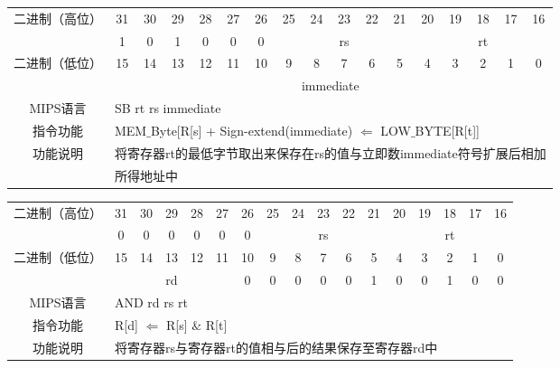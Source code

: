 \begin{table}
\begin{tabular}{|c|c|c|c|c|c|c|c|c|c|c|c|c|c|c|c|c|}
\hline
\multirow{2}{*}{二进制（高位）} &
31&30&29&28&27&26&25&24&23&22&21&20&19&18&17&16\\
\cline{2-17}
&
1&0&1&0&0&
0&
\multicolumn{5}{c|}{rs}&
\multicolumn{5}{c|}{rt}\\
\hline
\multirow{2}{*}{二进制（低位）} &
15&14&13&12&11&10&9&8&7&6&5&4&3&2&1&0\\
\cline{2-17}
&
\multicolumn{16}{c|}{immediate}\\
\hline
MIPS语言&
\multicolumn{16}{l|}{SB rt rs immediate}\\
\hline
指令功能&
\multicolumn{16}{l|}{MEM$\_$Byte[R[s] + Sign-extend(immediate) $\Leftarrow$ LOW$\_$BYTE[R[t]]}\\
\hline
\multirow{2}{*}{功能说明}&
\multicolumn{16}{l|}{将寄存器rt的最低字节取出来保存在rs的值与立即数immediate符号扩展后相加}\\
&\multicolumn{16}{l|}{所得地址中}\\
\hline
\end{tabular}
\end{table}

\clearpage

\begin{table}
\begin{tabular}{|c|c|c|c|c|c|c|c|c|c|c|c|c|c|c|c|c|}
\hline
\multirow{2}{*}{二进制（高位）} &
31&30&29&28&27&26&25&24&23&22&21&20&19&18&17&16\\
\cline{2-17}
&
0&0&0&0&0&
0&
\multicolumn{5}{c|}{rs}&
\multicolumn{5}{c|}{rt}\\
\hline
\multirow{2}{*}{二进制（低位）} &
15&14&13&12&11&10&9&8&7&6&5&4&3&2&1&0\\
\cline{2-17}
&
\multicolumn{5}{c|}{rd}&
0&0&0&0&0&
1&0&0&1&0&
0\\
\hline
MIPS语言&
\multicolumn{16}{l|}{AND rd rs rt}\\
\hline
指令功能&
\multicolumn{16}{l|}{R[d] $\Leftarrow$ R[s] $\&$ R[t]}\\
\hline
功能说明&
\multicolumn{16}{l|}{将寄存器rs与寄存器rt的值相与后的结果保存至寄存器rd中}\\
\hline
\end{tabular}
\end{table}

